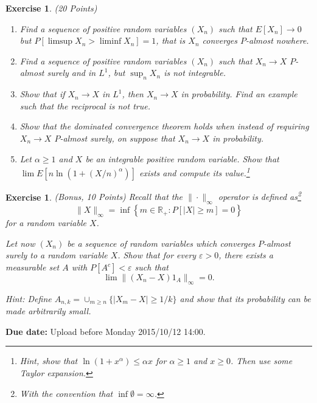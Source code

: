 \documentclass[DIV=classic,a4paper,10pt]{scrartcl}
\newtheorem{exercise}[theorem]{Exercise}
\theoremstyle{nonumberplain}
\numberwithin{equation}{section}
\begin{document}
\begin{exercise} (20 Points) 
    \begin{enumerate}[label=(\alph*), fullwidth]
        \item Find a sequence of positive random variables $(X_n)$ such that $E[X_n]\to 0$ but $P[\limsup X_n>\liminf X_n]=1$, that is $X_n$ converges $P$-almost nowhere.
        \item Find a sequence of positive random variables $(X_n)$ such that $X_n\to X$ $P$-almost surely and in $L^1$, but $\sup_n X_n $ is not integrable.
        \item Show that if $X_n\to X$ in $L^1$, then $X_n\to X$ in probability.
            Find an example such that the reciprocal is not true.
        \item Show that the dominated convergence theorem holds when instead of requiring $X_n\to X$ $P$-almost surely, on suppose that $X_n\to X$ in probability.
        \item Let $\alpha\geq 1$ and $X$ be an integrable positive random variable.
            Show that $\lim E[n\ln(1+(X/n)^\alpha)]$ exists and compute its value.\footnote{Hint, show that $\ln(1+x^\alpha)\leq \alpha x$ for $\alpha\geq 1$ and $x\geq 0$. Then use some Taylor expansion.}
    \end{enumerate}
\end{exercise}
\begin{exercise}(Bonus, 10 Points)
    Recall that the $\|\cdot\|_{\infty}$ operator is defined as\footnote{With the convention that $\inf \emptyset =\infty$.}
    \begin{equation*}
        \|X\|_{\infty}=\inf\left\{ m\in \mathbb{R}_+\colon P\left[ |X|\geq m \right]=0 \right\}
    \end{equation*}
    for a random variable $X$.

    Let now $(X_n)$ be a sequence of random variables which converges $P$-almost surely to a random variable $X$.
    Show that for every $\varepsilon>0$, there exists a measurable set $A$ with $P[A^c]<\varepsilon$ such that
    \begin{equation*}
        \lim \|(X_n-X)1_A\|_{\infty}=0.
    \end{equation*}

    Hint: Define $A_{n,k}=\cup_{m\geq n}\{|X_m-X|\geq 1/k\}$ and show that its probability can be made arbitrarily small.
\end{exercise}
\smallskip
\noindent
\textbf{Due date:} Upload before Monday 2015/10/12 14:00.
\end{document}
